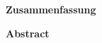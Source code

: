 \newpage
\cleardoublepage

\begin{minipage}[0.49\textheight]{0.95\textwidth}
    \normalsize
    \textbf{Zusammenfassung}\par
    \vspace{\baselineskip}
    \small
    
\end{minipage}

\newpage
\cleardoublepage

\begin{minipage}[0.49\textheight]{0.95\textwidth}
    \normalsize
    \textbf{Abstract}\par
    \vspace{\baselineskip}
    \small
    
\end{minipage}
\newpage\null\newpage
